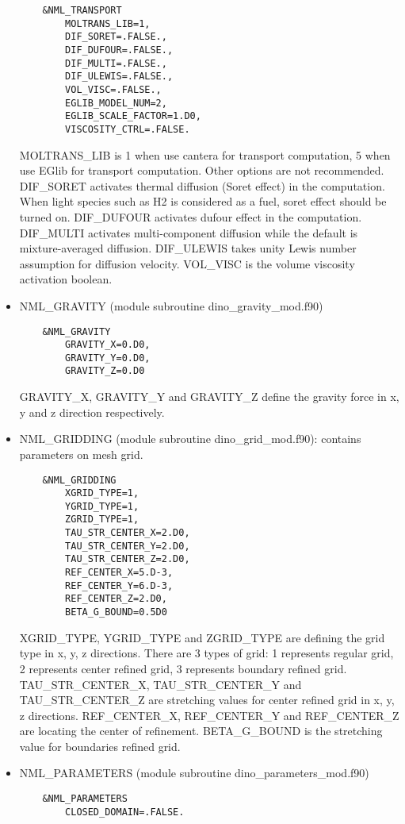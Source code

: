 \begin{itemize}
\begin{lstlisting}
    &NML_TRANSPORT
        MOLTRANS_LIB=1,
        DIF_SORET=.FALSE.,
        DIF_DUFOUR=.FALSE.,
        DIF_MULTI=.FALSE.,
        DIF_ULEWIS=.FALSE.,
        VOL_VISC=.FALSE.,
        EGLIB_MODEL_NUM=2,
        EGLIB_SCALE_FACTOR=1.D0,
        VISCOSITY_CTRL=.FALSE.
  \end{lstlisting}
  MOLTRANS\_LIB is 1 when use cantera for transport computation, 5 when use EGlib for transport computation. Other options are not recommended. DIF\_SORET activates thermal diffusion (Soret effect) in the computation. When light species such as H2 is considered as a fuel, soret effect should be turned on. DIF\_DUFOUR activates dufour effect in the computation. DIF\_MULTI activates multi-component diffusion while the default is mixture-averaged diffusion. DIF\_ULEWIS takes unity Lewis number assumption for diffusion velocity. VOL\_VISC is the volume viscosity activation boolean.
  \item NML\_GRAVITY (module subroutine dino\_gravity\_mod.f90)
  \begin{lstlisting}
    &NML_GRAVITY
        GRAVITY_X=0.D0,
        GRAVITY_Y=0.D0,
        GRAVITY_Z=0.D0
  \end{lstlisting}
  GRAVITY\_X, GRAVITY\_Y and GRAVITY\_Z define the gravity force in x, y and z direction respectively.
  \item NML\_GRIDDING (module subroutine dino\_grid\_mod.f90): contains parameters on mesh grid.
  \begin{lstlisting}
    &NML_GRIDDING
        XGRID_TYPE=1,
        YGRID_TYPE=1,
        ZGRID_TYPE=1,
        TAU_STR_CENTER_X=2.D0,
        TAU_STR_CENTER_Y=2.D0,
        TAU_STR_CENTER_Z=2.D0,
        REF_CENTER_X=5.D-3,
        REF_CENTER_Y=6.D-3,
        REF_CENTER_Z=2.D0,
        BETA_G_BOUND=0.5D0
  \end{lstlisting}
  XGRID\_TYPE, YGRID\_TYPE and ZGRID\_TYPE are defining the grid type in x, y, z directions. There are 3 types of grid: 1 represents regular grid, 2 represents center refined grid, 3 represents boundary refined grid. TAU\_STR\_CENTER\_X, TAU\_STR\_CENTER\_Y and TAU\_STR\_CENTER\_Z are stretching values for center refined grid in x, y, z directions. REF\_CENTER\_X, REF\_CENTER\_Y and REF\_CENTER\_Z are locating the center of refinement. BETA\_G\_BOUND is the stretching value for boundaries refined grid.
  \item NML\_PARAMETERS (module subroutine dino\_parameters\_mod.f90)
  \begin{lstlisting}
    &NML_PARAMETERS
        CLOSED_DOMAIN=.FALSE.

\end{lstlisting}
\end{itemize}
